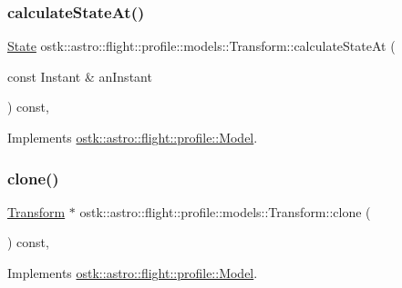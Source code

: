 \subsubsection{\texorpdfstring{calculate\+State\+At()}{calculateStateAt()}}
{\footnotesize\ttfamily \hyperlink{classostk_1_1astro_1_1flight_1_1profile_1_1_state}{State} ostk\+::astro\+::flight\+::profile\+::models\+::\+Transform\+::calculate\+State\+At (\begin{DoxyParamCaption}\item[{const Instant \&}]{an\+Instant }\end{DoxyParamCaption}) const\hspace{0.3cm}{\ttfamily [override]}, {\ttfamily [virtual]}}



Implements \hyperlink{classostk_1_1astro_1_1flight_1_1profile_1_1_model_a1b205fa29b50fcfc06c99234a8579eb8}{ostk\+::astro\+::flight\+::profile\+::\+Model}.

\mbox{\label{classostk_1_1astro_1_1flight_1_1profile_1_1models_1_1_transform_aafd4791dacf320ddedddefbc8d0f2e0e}} 
\subsubsection{\texorpdfstring{clone()}{clone()}}
{\footnotesize\ttfamily \hyperlink{classostk_1_1astro_1_1flight_1_1profile_1_1models_1_1_transform}{Transform} $\ast$ ostk\+::astro\+::flight\+::profile\+::models\+::\+Transform\+::clone (\begin{DoxyParamCaption}{ }\end{DoxyParamCaption}) const\hspace{0.3cm}{\ttfamily [override]}, {\ttfamily [virtual]}}



Implements \hyperlink{classostk_1_1astro_1_1flight_1_1profile_1_1_model_aabf68c114849fa16a570b694579da40f}{ostk\+::astro\+::flight\+::profile\+::\+Model}.

\mbox{\label{classostk_1_1astro_1_1flight_1_1profile_1_1models_1_1_transform_a7eb8b58fd5f72e8ee9aa3b94cd0ffaaa}} 
